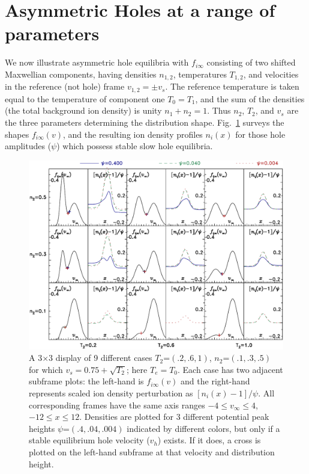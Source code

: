 \documentclass[pre]{revtex4-2}
\begin{document}
\section{Asymmetric Holes at a range of parameters}

We now illustrate asymmetric hole equilibria with $f_{i\infty}$
consisting of two shifted Maxwellian components, having densities
$n_{1,2}$, temperatures $T_{1,2}$, and velocities in the reference
(not hole) frame $v_{1,2}=\pm v_s$. The reference temperature is taken
equal to the temperature of component one $T_0=T_1$, and the sum of
the densities (the total background ion density) is unity
$n_1+n_2=1$. Thus $n_2$, $T_2$, and $v_s$ are the three parameters
determining the distribution shape. Fig.\ \ref{fig:multiden} surveys
the shapes $f_{i\infty}(v)$, and the resulting ion density profiles
$n_i(x)$ for those hole amplitudes ($\psi$) which possess stable slow
hole equilibria.
\begin{figure}[htp]
  \centering
  \includegraphics[width=.9\hsize]{multiden}
  \caption{A 3$\times$3 display of 9 different cases
    $T_2$=$(.2,.6,1)$, $n_2$=$(.1,.3,.5)$ for which
    $v_s=0.75+\sqrt{T_2}$; here $T_e=T_0$. Each case has two adjacent
    subframe plots: the left-hand is $f_{i\infty}(v)$ and the
    right-hand represents scaled ion density perturbation as
    $[n_i(x)-1]/\psi$. All corresponding frames have the same axis
    ranges $-4\le v_\infty\le 4$, $-12\le x \le 12$. Densities are
    plotted for 3 different potential peak heights
    $\psi$=$(.4,.04,.004)$ indicated by different colors, but only if
    a stable equilibrium hole velocity ($v_h$) exists. If it does, a
    cross is plotted on the left-hand subframe at that
    velocity and distribution height.}
  \label{fig:multiden}
\end{figure}
\end{document}
